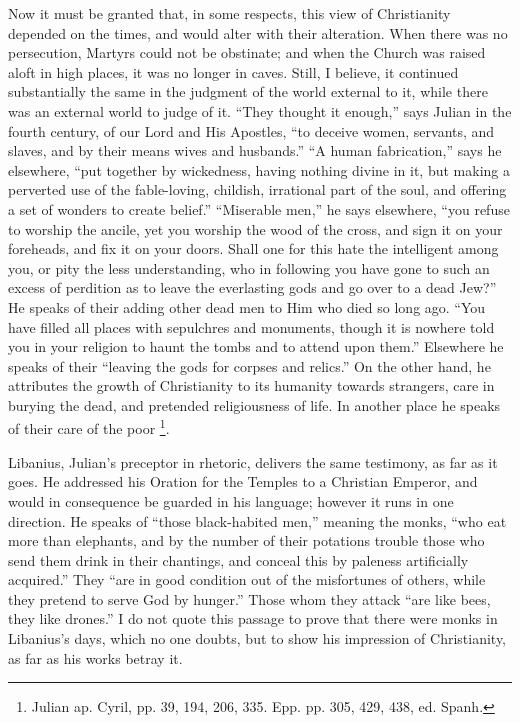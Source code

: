 Now it must be granted that, in some respects, this
view of Christianity depended on the times, and would
alter with their alteration. When there was no
persecution, Martyrs could not be obstinate; and when the
Church was raised aloft in high places, it was no longer
in caves. Still, I believe, it continued substantially
the same in the judgment of the world external to it,
while there was an external world to judge of it.
``They thought it enough,'' says Julian in the
fourth century, of our Lord and His Apostles, ``to
deceive women, servants, and slaves, and by their means
wives and husbands.'' ``A human
fabrication,'' says he elsewhere, ``put together
by wickedness, having nothing divine in it, but making a
perverted use of the fable-loving, childish, irrational
part of the soul, and offering a set of wonders to create
belief.'' ``Miserable men,'' he says
elsewhere, ``you refuse to worship the ancile, yet
you worship the wood of the cross, and sign it on your
foreheads, and fix it on your doors. Shall one for this
hate the intelligent among you, or pity the less
understanding, who in following you have gone to such an
excess of perdition as to leave the everlasting gods and
go over to a dead Jew?'' He speaks of their adding
other dead men to Him who died so long ago. ``You
have filled all places with sepulchres and monuments,
though it is nowhere told you in your religion to haunt
the tombs and to attend upon them.'' Elsewhere he
speaks of their ``leaving the gods for corpses and
relics.'' On the other hand, he attributes the growth
of Christianity to its humanity towards strangers, care
in burying the dead, and pretended religiousness of life.
In another place he speaks of their care of the poor \footnote{Julian ap. Cyril, pp. 39,
194, 206, 335. Epp. pp. 305, 429, 438, ed. Spanh.}.

Libanius, Julian's preceptor in rhetoric, delivers the
same testimony, as far as it goes. He addressed his
Oration for the Temples to a Christian Emperor, and would
in consequence be guarded in his language; however it
runs in one direction. He speaks of ``those
black-habited men,'' meaning the monks, ``who eat
more than elephants, and by the number of their potations
trouble those who send them drink in their chantings, and
conceal this by paleness artificially acquired.''
They ``are in good condition out of the misfortunes
of others, while they pretend to serve God by
hunger.'' Those whom they attack ``are like bees,
they like drones.'' I do not quote this passage to
prove that there were monks in Libanius's days, which no
one doubts, but to show his impression of Christianity,
as far as his works betray it.


